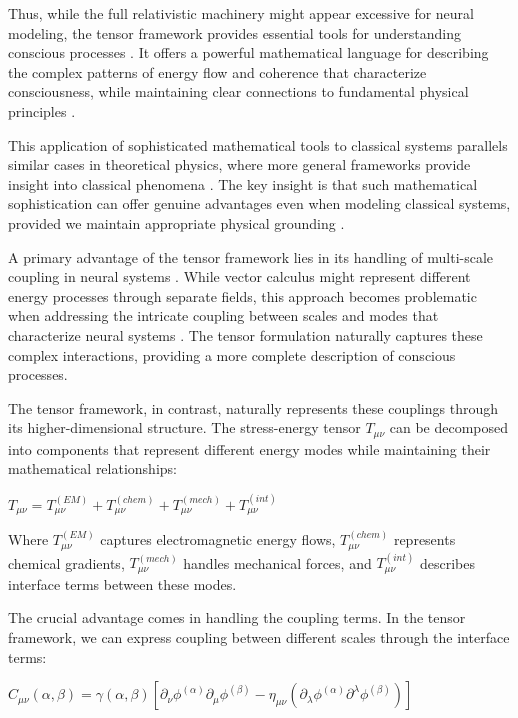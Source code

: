 Thus, while the full relativistic machinery might appear excessive for neural modeling, the tensor framework provides essential tools for understanding conscious processes \cite{varela2016embodied}. It offers a powerful mathematical language for describing the complex patterns of energy flow and coherence that characterize consciousness, while maintaining clear connections to fundamental physical principles \cite{rovelli2018order}.

This application of sophisticated mathematical tools to classical systems parallels similar cases in theoretical physics, where more general frameworks provide insight into classical phenomena \cite{langer2009philosophy}. The key insight is that such mathematical sophistication can offer genuine advantages even when modeling classical systems, provided we maintain appropriate physical grounding \cite{chalmers2010character}.

A primary advantage of the tensor framework lies in its handling of multi-scale coupling in neural systems \cite{deacon2011incomplete}. While vector calculus might represent different energy processes through separate fields, this approach becomes problematic when addressing the intricate coupling between scales and modes that characterize neural systems \cite{thompson2014waking}. The tensor formulation naturally captures these complex interactions, providing a more complete description of conscious processes.

The tensor framework, in contrast, naturally represents these couplings through its higher-dimensional structure. The stress-energy tensor $T_{\mu\nu}$ can be decomposed into components that represent different energy modes while maintaining their mathematical relationships:

$T_{\mu\nu} = T^{(EM)}_{\mu\nu} + T^{(chem)}_{\mu\nu} + T^{(mech)}_{\mu\nu} + T^{(int)}_{\mu\nu}$

Where $T^{(EM)}_{\mu\nu}$ captures electromagnetic energy flows, $T^{(chem)}_{\mu\nu}$ represents chemical gradients, $T^{(mech)}_{\mu\nu}$ handles mechanical forces, and $T^{(int)}_{\mu\nu}$ describes interface terms between these modes.

The crucial advantage comes in handling the coupling terms. In the tensor framework, we can express coupling between different scales through the interface terms:

$C_{\mu\nu}(\alpha,\beta) = \gamma(\alpha,\beta)[\partial_\nu\phi^{(\alpha)}\partial_\mu\phi^{(\beta)} - \eta_{\mu\nu}(\partial_\lambda\phi^{(\alpha)}\partial^\lambda\phi^{(\beta)})]$

